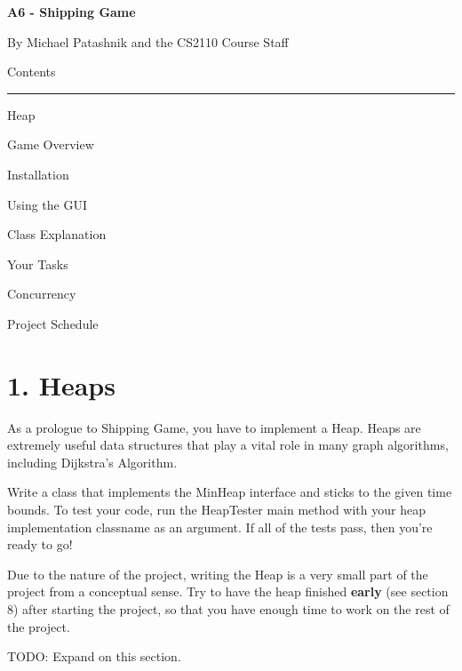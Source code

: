 \documentclass[11pt]{article}
\begin{document}
\lstset{language=Java}
\begin{center}
\begin{HUGE}{\bf A6 - Shipping Game}\\ \end{HUGE}
\vspace{3mm}
\begin{LARGE} By Michael Patashnik and the CS2110 Course Staff\\ \end{LARGE}
\vspace{7mm}
\begin{LARGE} Contents\\ \end{LARGE}
\noindent\rule{8cm}{0.4pt}
\begin{enumerate} \begin{large}
\item Heap
\item Game Overview
\item Installation
\item Using the GUI
\item Class Explanation
\item Your Tasks
\item Concurrency
\item Project Schedule
\end{large}\end{enumerate}
\end{center}
\newpage

\section{1. Heaps}
As a prologue to Shipping Game, you have to implement a Heap. Heaps are
extremely useful data structures that play a vital role in many graph
algorithms, including Dijkstra's Algorithm.

Write a class that implements the MinHeap interface and sticks to the given time
bounds. To test your code, run the HeapTester main method with your heap
implementation classname as an argument. If all of the tests pass, then you're
ready to go!

Due to the nature of the project, writing the Heap is a very small part of the
project from a conceptual sense. Try to have the heap finished \textbf{early}
(see section 8) after starting the project, so that you have enough time to work
on the rest of the project.

TODO: Expand on this section.
\end{document}
